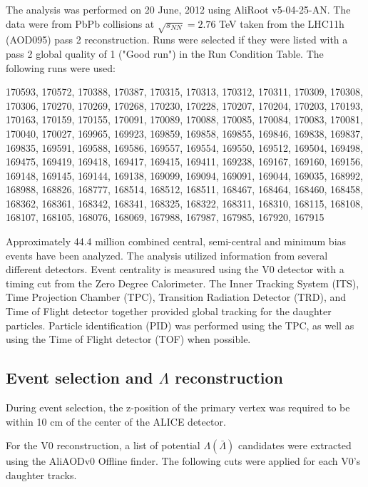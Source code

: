 The analysis was performed on 20 June, 2012 using AliRoot v5-04-25-AN. The data were from PbPb collisions at $\sqrt{s_{NN}}=2.76$  TeV taken from the LHC11h (AOD095) pass 2 reconstruction. Runs were selected if they were listed with a pass 2 global quality of 1 ("Good run") in the Run Condition Table. The following runs were used:

170593, 170572, 170388, 170387, 170315, 170313, 170312, 170311, 170309, 170308, 170306, 170270, 170269, 170268, 170230, 170228, 170207, 170204, 170203, 170193, 170163, 170159, 170155, 170091, 170089, 170088, 170085, 170084, 170083, 170081, 170040, 170027, 169965, 169923, 169859, 169858, 169855, 169846, 169838, 169837, 169835, 169591, 169588, 169586, 169557, 169554, 169550, 169512, 169504, 169498, 169475, 169419, 169418, 169417, 169415, 169411, 169238, 169167, 169160, 169156, 169148, 169145, 169144, 169138, 169099, 169094, 169091, 169044, 169035, 168992, 168988, 168826, 168777, 168514, 168512, 168511, 168467, 168464, 168460, 168458, 168362, 168361, 168342, 168341, 168325, 168322, 168311, 168310, 168115, 168108, 168107, 168105, 168076, 168069, 167988, 167987, 167985, 167920, 167915

Approximately 44.4 million combined central, semi-central and minimum bias events have been analyzed. The analysis utilized information from several different detectors.  Event centrality is measured using the V0 detector with a timing cut from the Zero Degree Calorimeter.  The Inner Tracking System (ITS), Time Projection Chamber (TPC), Transition Radiation Detector (TRD), and Time of Flight detector together provided global tracking for the daughter particles.  Particle identification (PID) was performed using the TPC, as well as using the Time of Flight detector (TOF) when possible.

\subsection{Event selection and $\Lambda$ reconstruction}
\label{sec:Recon}

During event selection, the z-position of the primary vertex was required to be within 10 cm of the center of the ALICE detector.  

For the V0 reconstruction, a list of potential $\Lambda(\bar{\Lambda})$ candidates were extracted using the AliAODv0 Offline finder. The following cuts were applied for each V0's daughter tracks.

